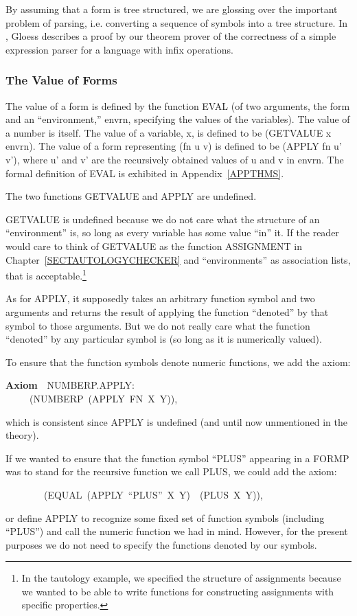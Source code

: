 \documentclass[10pt]{book}
\newenvironment{pubasis}{\begin{flushleft}}{\end{flushleft}}
\newcommand{\axiomordefinition}[1]{\vspace{6pt}\Large\textsf{\textbf{#1}}\normalsize}
\begin{document}
By assuming that a form is tree structured, we are glossing
over the important problem of parsing, i.e. converting
a sequence of symbols into a tree structure.
In \cite{GLOESS}, Gloess describes a proof by our theorem
prover of the correctness of a simple expression parser for
a language with infix operations.

\subsubsection{The Value of Forms}
The value of a form is defined by the function EVAL (of two arguments, the
form and an ``environment,'' envrn, specifying the values of the variables).
The value of a number is itself.  The value of a variable, x, is
defined to be (GETVALUE x envrn).
The value of a form representing (fn u v) is defined to be
(APPLY fn u' v'), where u' and v' are the recursively
obtained values of u and v in envrn.
The formal definition of EVAL is exhibited
in Appendix~\ref{APPTHMS}.

The two functions GETVALUE and APPLY are undefined.

GETVALUE is undefined because we do not care what the structure
of an ``environment'' is, so long as every variable has some value ``in'' it.
If the reader would care to think of GETVALUE as the function ASSIGNMENT
in Chapter~\ref{SECTAUTOLOGYCHECKER} and ``environments'' as association lists,
that is acceptable.\footnote{In the tautology example, we specified the structure of assignments because we wanted to be able to write functions for constructing assignments with specific properties.}

As for APPLY, it supposedly takes an arbitrary function symbol
and two arguments and returns the result of applying the function ``denoted''
by that symbol to those arguments.  But we do not really care what
the function ``denoted'' by any particular symbol is (so long as it is
numerically valued).

To ensure that the function symbols denote
numeric functions, we add the axiom:
\begin{pubasis}
\axiomordefinition{Axiom}~~NUMBERP.APPLY:\\
~~~~~(NUMBERP~(APPLY~FN~X~Y)),\\
\end{pubasis}
which is consistent since APPLY is undefined (and until now unmentioned
in the theory).

If we wanted to ensure that the function symbol ``PLUS'' appearing in
a FORMP was to stand for the recursive function we call PLUS, we could
add the axiom:
\begin{pubasis}
~~~~~~~~(EQUAL~(APPLY~``PLUS''~X~Y)~~(PLUS~X~Y)),\\
\end{pubasis}
or define APPLY to recognize some fixed set of function symbols
(including ``PLUS'') and call the numeric function we had
in mind.
However, for the present purposes we do not need to specify the
functions denoted by our symbols.
\end{document}
